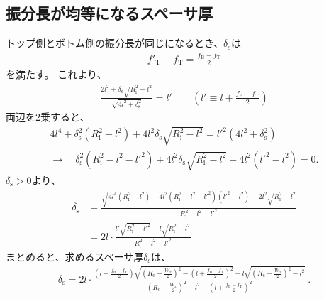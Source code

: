 \subsection{振分長が均等になるスペーサ厚}
トップ側とボトム側の振分長が同じになるとき、$\delta_\mathrm s$は
\begin{align*}
  f'_\mathrm T - f_\mathrm T = \frac{f_\mathrm B - f_\mathrm T}2
\end{align*}
を満たす。
これより、
\begin{align*}
  \frac{2l^2+\delta_\mathrm s\sqrt{R_\mathrm i^2-l^2}}{\sqrt{4l^2+\delta_\mathrm s^2}} = l'\qquad
  \left(l' \equiv l + \frac{f_\mathrm B-f_\mathrm T}2\right)
\end{align*}
両辺を2乗すると、
\begin{gather*}
  4l^4+\delta_\mathrm s^2\left(R_\mathrm i^2-l^2\right)+4l^2\delta_\mathrm s\sqrt{R_\mathrm i^2-l^2}
  = l'^2\left(4l^2+\delta_\mathrm s^2\right)\\
  \longrightarrow\quad
  \delta_\mathrm s^2\left(R_\mathrm i^2-l^2-l'^2\right)
  +4l^2\delta_\mathrm s\sqrt{R_\mathrm i^2-l^2} -4l^2\left(l'^2 - l^2\right)
  = 0.
\end{gather*}
$\delta_\mathrm s > 0$より、
\begin{align*}
  \delta_\mathrm s
  &= \frac{\sqrt{4l^4\left(R_\mathrm i^2-l^2\right)
                 +4l^2\left(R_\mathrm i^2-l^2-l'^2\right)\left(l'^2 - l^2\right)}
           -2l^2\sqrt{R_\mathrm i^2-l^2}}{R_\mathrm i^2-l^2-l'^2}\\
  &= 2l\cdot\frac{l'\sqrt{R_\mathrm i^2-l'^2}-l\sqrt{R_\mathrm i^2-l^2}}{R_\mathrm i^2-l^2-l'^2}
\end{align*}
まとめると、求めるスペーサ厚$\delta_\mathrm s$は、
\begin{align*}
  \delta_\mathrm s
  = 2l\cdot
    \frac{\displaystyle
          \left(l+\frac{f_\mathrm B-f_\mathrm T}2\right)
          \sqrt{\left(R_\mathrm c-\frac{W_x}2\right)^2
                -\left(l+\frac{f_\mathrm B-f_\mathrm T}2\right)^2}
          -l\sqrt{\left(R_\mathrm c-\frac{W_x}2\right)^2-l^2}}
         {\displaystyle
          \left(R_\mathrm c-\frac{W_x}2\right)^2-l^2
          -\left(l+\frac{f_\mathrm B-f_\mathrm T}2\right)^2}~.
\end{align*}



